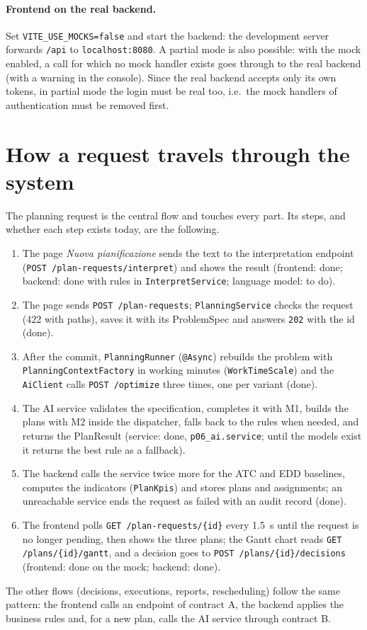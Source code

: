 \paragraph{Frontend on the real backend.} Set \texttt{VITE\_USE\_MOCKS=false} and start the
backend: the development server forwards \texttt{/api} to \texttt{localhost:8080}. A partial mode
is also possible: with the mock enabled, a call for which no mock handler exists goes through to
the real backend (with a warning in the console). Since the real backend accepts only its own
tokens, in partial mode the login must be real too, i.e.\ the mock handlers of authentication must
be removed first.

\section{How a request travels through the system}
\label{sec:dev-flow}

The planning request is the central flow and touches every part. Its steps, and whether each
step exists today, are the following.
\begin{enumerate}
  \item The page \emph{Nuova pianificazione} sends the text to the interpretation endpoint
        (\texttt{POST /plan-requests/interpret}) and shows the result (frontend: done;
        backend: done with rules in \texttt{InterpretService}; language model: to do).
  \item The page sends \texttt{POST /plan-requests}; \texttt{PlanningService} checks the request
        (422 with paths), saves it with its ProblemSpec and answers \texttt{202} with the id
        (done).
  \item After the commit, \texttt{PlanningRunner} (\texttt{@Async}) rebuilds the problem with
        \texttt{PlanningContextFactory} in working minutes (\texttt{WorkTimeScale}) and the
        \texttt{AiClient} calls \texttt{POST /optimize} three times, one per variant (done).
  \item The AI service validates the specification, completes it with M1, builds the plans with
        M2 inside the dispatcher, falls back to the rules when needed, and returns the PlanResult
        (service: done, \texttt{p06\_ai.service}; until the models exist it returns the best rule
        as a fallback).
  \item The backend calls the service twice more for the ATC and EDD baselines, computes the
        indicators (\texttt{PlanKpis}) and stores plans and assignments; an unreachable service
        ends the request as failed with an audit record (done).
  \item The frontend polls \texttt{GET /plan-requests/\{id\}} every 1.5~s until the request is no
        longer pending, then shows the three plans; the Gantt chart reads
        \texttt{GET /plans/\{id\}/gantt}, and a decision goes to
        \texttt{POST /plans/\{id\}/decisions} (frontend: done on the mock; backend: done).
\end{enumerate}
The other flows (decisions, executions, reports, rescheduling) follow the same pattern: the
frontend calls an endpoint of contract A, the backend applies the business rules and, for a new
plan, calls the AI service through contract B.


